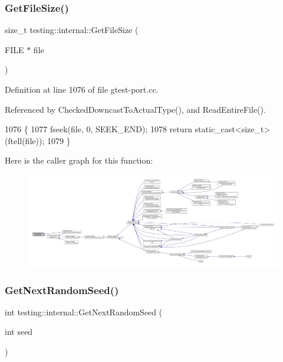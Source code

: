 \subsubsection{\texorpdfstring{Get\+File\+Size()}{GetFileSize()}}
{\footnotesize\ttfamily size\+\_\+t testing\+::internal\+::\+Get\+File\+Size (\begin{DoxyParamCaption}\item[{F\+I\+LE $\ast$}]{file }\end{DoxyParamCaption})}



Definition at line 1076 of file gtest-\/port.\+cc.



Referenced by Checked\+Downcast\+To\+Actual\+Type(), and Read\+Entire\+File().


\begin{DoxyCode}
1076                                \{
1077   fseek(file, 0, SEEK\_END);
1078   \textcolor{keywordflow}{return} \textcolor{keyword}{static\_cast<}\textcolor{keywordtype}{size\_t}\textcolor{keyword}{>}(ftell(file));
1079 \}
\end{DoxyCode}
Here is the caller graph for this function\+:
\nopagebreak
\begin{figure}[H]
\begin{center}
\leavevmode
\includegraphics[width=350pt]{namespacetesting_1_1internal_a06ca3f65f5e85c9ce7299b9e4cd52408_icgraph}
\end{center}
\end{figure}
\mbox{\label{namespacetesting_1_1internal_a6e07a655cb987d131cd8fbeba9a7f1eb}} 
\subsubsection{\texorpdfstring{Get\+Next\+Random\+Seed()}{GetNextRandomSeed()}}
{\footnotesize\ttfamily int testing\+::internal\+::\+Get\+Next\+Random\+Seed (\begin{DoxyParamCaption}\item[{int}]{seed }\end{DoxyParamCaption})\hspace{0.3cm}{\ttfamily [inline]}}




